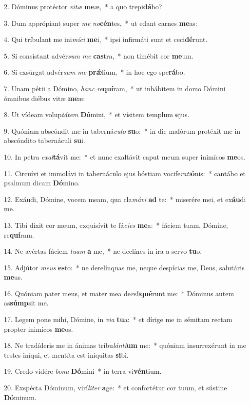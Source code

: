 2. Dóminus protéctor \textit{vi}\textit{tæ} \textbf{me}æ,~*  a quo trepi\textbf{dá}bo?\

3. Dum apprópiant super \textit{me} \textit{no}\textbf{cén}tes,~*  ut edant carnes \textbf{me}as:\

4. Qui tríbulant me ini\textit{mí}\textit{ci} \textbf{me}i,~*  ipsi infirmáti sunt et ceci\textbf{dé}runt.\

5. Si consístant advér\textit{sum} \textit{me} \textbf{cas}tra,~*  non timébit cor \textbf{me}um.\

6. Si exsúrgat advér\textit{sum} \textit{me} \textbf{prǽ}lium,~*  in hoc ego spe\textbf{rá}bo.\

7. Unam pétii a Dómino, \textit{hanc} \textit{re}\textbf{quí}ram,~*  ut inhábitem in domo Dómini ómnibus diébus vitæ \textbf{me}æ:\

8. Ut vídeam volup\textit{tá}\textit{tem} \textbf{Dó}mini,~*  et vísitem templum \textbf{e}jus.\

9. Quóniam abscóndit me in taberná\textit{cu}\textit{lo} \textbf{su}o:~*  in die malórum protéxit me in abscóndito tabernáculi \textbf{su}i.\

10. In petra \textit{ex}\textit{al}\textbf{tá}vit me:~*  et nunc exaltávit caput meum super inimícos \textbf{me}os.\

11. Circuívi et immolávi in tabernáculo ejus hóstiam vocife\textit{ra}\textit{ti}\textbf{ó}nis:~*  cantábo et psalmum dicam \textbf{Dó}mino.\

12. Exáudi, Dómine, vocem meam, qua cla\textit{má}\textit{vi} \textbf{ad} te:~*  miserére mei, et ex\textbf{áu}di me.\

13. Tibi dixit cor meum, exquisívit te fá\textit{ci}\textit{es} \textbf{me}a:~*  fáciem tuam, Dómine, re\textbf{quí}ram.\

14. Ne avértas fáciem \textit{tu}\textit{am} \textbf{a} me,~*  ne declínes in ira a servo \textbf{tu}o.\

15. Adjútor \textit{me}\textit{us} \textbf{es}to:~*  ne derelínquas me, neque despícias me, Deus, salutáris \textbf{me}us.\

16. Quóniam pater meus, et mater mea de\textit{re}\textit{li}\textbf{qué}runt me:~*  Dóminus autem as\textbf{súmp}sit me.\

17. Legem pone mihi, Dómine, in \textit{vi}\textit{a} \textbf{tu}a:~*  et dírige me in sémitam rectam propter inimícos \textbf{me}os.\

18. Ne tradíderis me in ánimas tribu\textit{lán}\textit{ti}\textbf{um} me:~*  quóniam insurrexérunt in me testes iníqui, et mentíta est iníquitas \textbf{si}bi.\

19. Credo vidére \textit{bo}\textit{na} \textbf{Dó}mini~*  in terra vi\textbf{vén}tium.\

20. Exspécta Dóminum, virí\textit{li}\textit{ter} \textbf{a}ge:~*  et confortétur cor tuum, et sústine \textbf{Dó}minum.\

